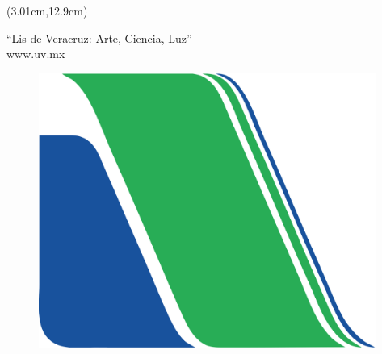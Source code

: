 
\thispagestyle{empty} %
\tikzexternaldisable %

\begin{textblock*}{10cm}(3.01cm,12.9cm)
	\begin{flushleft}
    {\GilliusCinco “Lis de Veracruz: Arte, Ciencia, Luz”}\\[10pt]
		{\GilliusSeis www.uv.mx}
	\end{flushleft}
\end{textblock*}

\begin{figure}[!b]
	\includegraphics[height=9cm,left]{Figuras/0-UV/Inferior.png}
\end{figure}

% 


\tikzexternalenable %
\restoregeometry %
